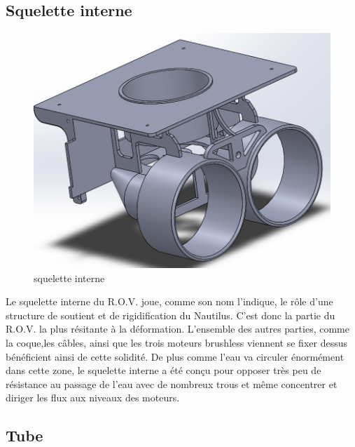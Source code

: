 \documentclass[a4paper,11pt]{report}
\begin{document}
				\subsection{Squelette interne}
				
				\begin{figure}[!h]
					\begin{center}
						\includegraphics[scale=0.3]{Photos/Capture5.png}
						\caption{squelette interne}
					\end{center}
				\end{figure}
				
				Le squelette interne du R.O.V. joue, comme son nom l'indique, le rôle d'une structure de soutient et de rigidification du Nautilus. C'est donc la partie du R.O.V. la plus résitante à la déformation. L'ensemble des autres parties, comme la coque,les câbles, ainsi que les trois moteurs brushless viennent se fixer dessus bénéficient ainsi de cette solidité. De plus comme l'eau va circuler énormément dans cette zone, le squelette interne a été conçu pour opposer très peu de résistance au passage de l'eau avec de nombreux trous et même concentrer et diriger les flux aux niveaux des moteurs. \newpage
					
					
				\subsection{Tube}	
				
\end{document}
